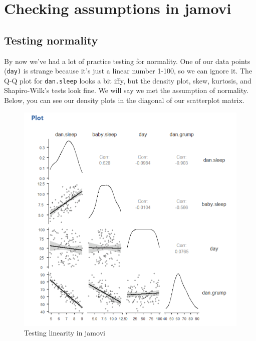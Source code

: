\documentclass[
]{book}
\begin{document}
\hypertarget{checking-assumptions-in-jamovi-4}{%
\section{Checking assumptions in jamovi}\label{checking-assumptions-in-jamovi-4}}

\hypertarget{testing-normality-2}{%
\subsection{Testing normality}\label{testing-normality-2}}

By now we've had a lot of practice testing for normality. One of our data points (\texttt{day)} is strange because it's just a linear number 1-100, so we can ignore it. The Q-Q plot for \texttt{dan.sleep} looks a bit iffy, but the density plot, skew, kurtosis, and Shapiro-Wilk's tests look fine. We will say we met the assumption of normality. Below, you can see our density plots in the diagonal of our scatterplot matrix.

\begin{figure}

{\centering \includegraphics[width=1\linewidth]{images/08-correlation/correlation-plots} 

}

\caption{Testing linearity in jamovi}\label{fig:unnamed-chunk-8}
\end{figure}
\end{document}
